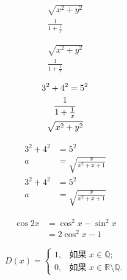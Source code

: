 \documentclass{article} %
\begin{document}
	\begin{gather}
		\sqrt{x^2+y^2} \\
		\frac{1}{1+\frac{1}{x}}
	\end{gather}

	\begin{gather*}
		\sqrt{x^2+y^2} \\
		\frac{1}{1+\frac{1}{x}}
	\end{gather*}

	\begin{gather}
		3^2+4^2=5^2 \notag \\
		\frac{1}{1+\frac{1}{x}} \notag \\
		\sqrt{x^2+y^2}
	\end{gather}

	\begin{align}
		3^2+4^2 &= 5^2 \\
		a &= \sqrt{\frac{x}{x^2+x+1}}
	\end{align}
	\begin{align*}
		3^2+4^2 &= 5^2 \\
		a &= \sqrt{\frac{x}{x^2+x+1}}
	\end{align*}

	\begin{equation}
		\begin{split}
			\cos 2x &= \cos^2 x - \sin^2 x \\
			&= 2\cos^2 x - 1
		\end{split}
	\end{equation}

	\begin{equation}
		D(x)= \begin{cases}
			1, & \text{如果 } x \in \mathbb{Q}; \\ %
			0, & \text{如果 } x \in \mathbb{R}\setminus\mathbb{Q}.
		\end{cases}
	\end{equation}
	
\end{document}
